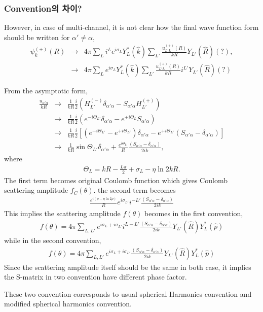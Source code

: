 \documentclass[10pt]{book}
\newcommand{\bea}{\begin{eqnarray}}
\newcommand{\eea}{\end{eqnarray}}
\newcommand{\no}{\nonumber \\}
\begin{document}
\subsubsection{Convention의 차이?} 
However, in case of multi-channel, it is not clear how the final wave function form should be written
for $\alpha'\neq \alpha$, 
\bea 
\psi^{(+)}_{k}(R)&\to& 4\pi \sum_{L} i^L e^{i\sigma_L} Y_{L}^*(\hat{k})
                       \sum_{L'} \frac{u^{(+)}_{L'L}(R)}{k R} Y_{L'}(\hat{R}) (?),\no 
                 &\to& 4\pi \sum_{L} e^{i\sigma_L} Y_{L}^*(\hat{k})
                 \sum_{L'} \frac{u^{(+)}_{L'L}(R)}{k R} i^{L'} Y_{L'}(\hat{R}) (?)      
\eea 


From the asymptotic form,
\bea 
\frac{u_{\alpha'\alpha}}{kR} &\to& \frac{1}{kR}\frac{i}{2}\left(H_{L'}^{(-)}\delta_{\alpha'\alpha}-S_{\alpha'\alpha} H_{L'}^{(+)}\right) \no 
                 &\to & \frac{1}{kR}\frac{i}{2}\left( e^{-i\Theta_{L'}} \delta_{\alpha'\alpha} 
                                        -e^{+i\Theta_L} S_{\alpha'\alpha} \right) \no 
                 &\to& \frac{1}{kR} \frac{i}{2}\left[ (e^{-i\Theta_{L'}}-e^{+i\Theta_{L'}}) \delta_{\alpha'\alpha} 
                                         -e^{+i\Theta_{L'}}(S_{\alpha'\alpha}-\delta_{\alpha'\alpha})  
                 \right]                       \no 
                 &\to& \frac{1}{kR} \sin\Theta_{L'}\delta_{\alpha'\alpha} 
                       +\frac{e^{i\Theta_{L'}}}{R}  \frac{(S_{\alpha'\alpha}-\delta_{\alpha'\alpha})}{2ik},   
\eea  
where 
\bea 
\Theta_L=k R- \frac{L\pi}{2}+\sigma_{L}-\eta \ln 2 k R. 
\eea 
The first term becomes original Coulomb function which gives Coulomb scattering amplitude $f_C(\theta)$.
the second term becomes 
\bea 
\frac{e^{i(\rho-\eta \ln 2\rho)}}{R} e^{i\sigma_{L'}} i^{-L'} \frac{(S_{\alpha'\alpha}-\delta_{\alpha'\alpha})}{2ik}   
\eea 
This implies the scattering amplitude $f(\theta)$ becomes in the first convention,
\bea 
f(\theta)=4\pi\sum_{L,L'} e^{i\sigma_L+i\sigma_{L'}} i^{L-L'}\frac{(S_{\alpha'\alpha}-\delta_{\alpha'\alpha})}{2ik} 
          Y_{L'}(\hat{R}) Y_{L}^*(\hat{p})
\eea  
while in the second convention,
\bea 
f(\theta)=4\pi\sum_{L,L'} e^{i\sigma_L+i\sigma_{L'}} \frac{(S_{\alpha'\alpha}-\delta_{\alpha'\alpha})}{2ik} Y_{L'}(\hat{R})Y_{L}^*(\hat{p})
\eea  
Since the scattering amplitude itself should be the same in both case, it implies the S-matrix in two convention
have different phase factor. 

These two convention corresponds to usual spherical Harmonics convention and 
modified spherical harmonics convention. 
\end{document}
